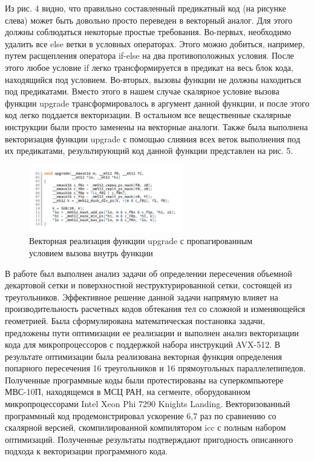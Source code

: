 Из рис. 4 видно, что правильно составленный предикатный код (на рисунке слева) может быть довольно просто переведен в векторный аналог.
Для этого должны соблюдаться некоторые простые требования. Во-первых, необходимо удалить все else ветки в условных операторах.
Этого можно добиться, например, путем расщепления оператора if-else на два противоположных условия.
После этого любое условие if легко трансформируется в предикат на весь блок кода, находящийся под условием.
Во-вторых, вызовы функции не должны находиться под предикатами.
Вместо этого в нашем случае скалярное условие вызова функции upgrade трансформировалось в аргумент данной функции, и после этого код легко поддается векторизации.
В остальном все вещественные скалярные инструкции были просто заменены на векторные аналоги.
Также была выполнена векторизация функции upgrade с помощью слияния всех веток выполнения под их предикатами, результирующий код данной функции представлен на рис. 5.

\begin{figure}[ht]
	\centering
		\includegraphics[width=0.6\textwidth]{./pics/text_4_mesh_intersect/upgrade_vec.pdf}
	\caption{Векторная реализация функции upgrade с пропагированным условием вызова внутрь функции}
	\label{fig:text_1_mesh_intersect_upgrade}
\end{figure}

В работе был выполнен анализ задачи об определении пересечения объемной декартовой сетки и поверхностной неструктурированной сетки, состоящей из треугольников.
Эффективное решение данной задачи напрямую влияет на производительность расчетных кодов обтекания тел со сложной и изменяющейся геометрией.
Была сформулирована математическая постановка задачи, предложены пути оптимизации ее реализации и выполнен анализ векторизации кода для микропроцессоров с поддержкой набора инструкций AVX-512.
В результате оптимизации была реализована векторная функция определения попарного пересечения 16 треугольников и 16 прямоугольных параллелепипедов.
Полученные программные коды были протестированы на суперкомпьютере МВС-10П, находящемся в МСЦ РАН, на сегменте, оборудованном микропроцессорами Intel Xeon Phi 7290 Knights Landing.
Векторизованный программный код продемонстрировал ускорение 6,7 раз по сравнению со скалярной версией, скомпилированной компилятором icc с полным набором оптимизаций.
Полученные результаты подтверждают пригодность описанного подхода к векторизации программного кода.
